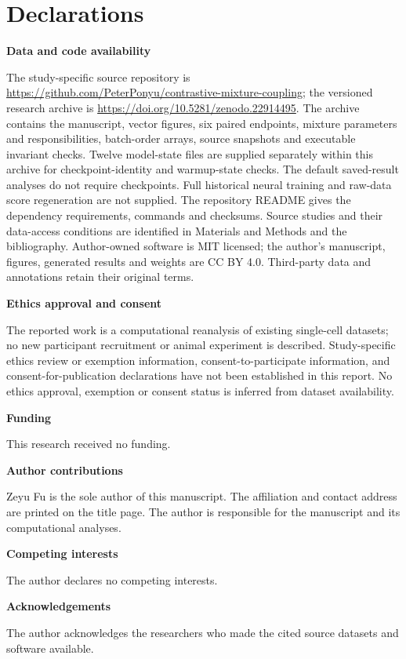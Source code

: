 \documentclass[11pt]{article}
\begin{document}
\section{Declarations}
\noindent\textbf{Data and code availability}\par\nobreak
The study-specific source repository is \url{https://github.com/PeterPonyu/contrastive-mixture-coupling}; the versioned research archive is \url{https://doi.org/10.5281/zenodo.22914495}. The archive contains the manuscript, vector figures, six paired endpoints, mixture parameters and responsibilities, batch-order arrays, source snapshots and executable invariant checks. Twelve model-state files are supplied separately within this archive for checkpoint-identity and warmup-state checks. The default saved-result analyses do not require checkpoints. Full historical neural training and raw-data score regeneration are not supplied. The repository README gives the dependency requirements, commands and checksums. Source studies and their data-access conditions are identified in Materials and Methods and the bibliography. Author-owned software is MIT licensed; the author's manuscript, figures, generated results and weights are CC BY 4.0. Third-party data and annotations retain their original terms.

\noindent\textbf{Ethics approval and consent}\par\nobreak
The reported work is a computational reanalysis of existing single-cell datasets; no new participant recruitment or animal experiment is described. Study-specific ethics review or exemption information, consent-to-participate information, and consent-for-publication declarations have not been established in this report. No ethics approval, exemption or consent status is inferred from dataset availability.

\noindent\textbf{Funding}\par\nobreak
This research received no funding.

\noindent\textbf{Author contributions}\par\nobreak
Zeyu Fu is the sole author of this manuscript. The affiliation and contact address are printed on the title page. The author is responsible for the manuscript and its computational analyses.

\noindent\textbf{Competing interests}\par\nobreak
The author declares no competing interests.

\noindent\textbf{Acknowledgements}\par\nobreak
The author acknowledges the researchers who made the cited source datasets and software available.

{\small\setlength{\bibsep}{0pt}}
\end{document}
